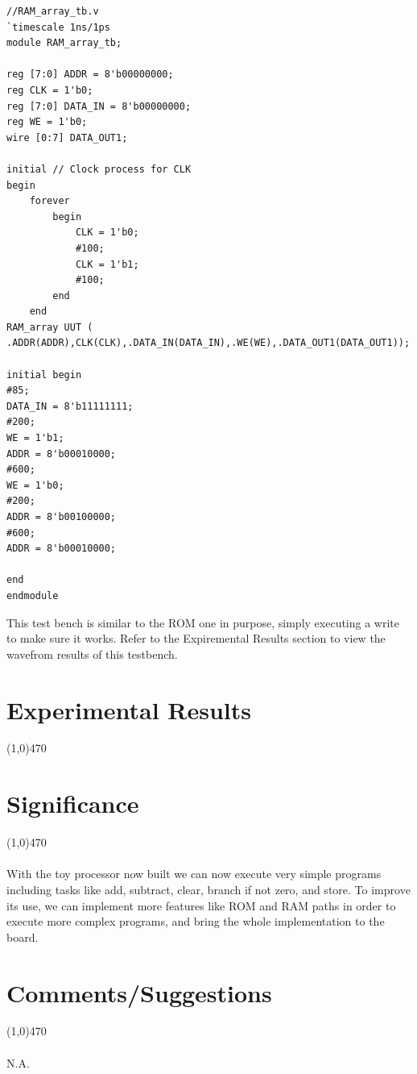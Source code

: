 \documentclass[12pt]{article}
\begin{document}
		\begin{Verbatim}[frame=single, fontsize= \small]
//RAM_array_tb.v
`timescale 1ns/1ps
module RAM_array_tb;

reg [7:0] ADDR = 8'b00000000;
reg CLK = 1'b0;
reg [7:0] DATA_IN = 8'b00000000;
reg WE = 1'b0;
wire [0:7] DATA_OUT1;

initial // Clock process for CLK
begin
	forever 
		begin
			CLK = 1'b0;
			#100;
			CLK = 1'b1; 
			#100;
		end
	end
RAM_array UUT (
.ADDR(ADDR),CLK(CLK),.DATA_IN(DATA_IN),.WE(WE),.DATA_OUT1(DATA_OUT1));

initial begin
#85;
DATA_IN = 8'b11111111;
#200;
WE = 1'b1;
ADDR = 8'b00010000;
#600;
WE = 1'b0;
#200;
ADDR = 8'b00100000;
#600;
ADDR = 8'b00010000;

end
endmodule
		\end{Verbatim}
		This test bench is similar to the ROM one in purpose, simply executing a write to make sure it works. Refer to the Expiremental Results section to view the wavefrom results of this testbench.

\newpage			
\section{Experimental Results}\vspace{-.7cm} \line(1,0){470}


	\newpage
\section{Significance} \vspace{-.7cm} \line(1,0){470}
	\paragraph{} 
		With the toy processor now built we can now execute very simple programs including tasks like add, subtract, clear, branch if not zero, and store. To improve its use, we can implement more features like ROM and RAM paths in order to execute more complex programs, and bring the whole implementation to the board. 

 \section{Comments/Suggestions}\vspace{-.7cm} \line(1,0){470}
 	\paragraph{} 
 		N.A.
		
\end{document}
